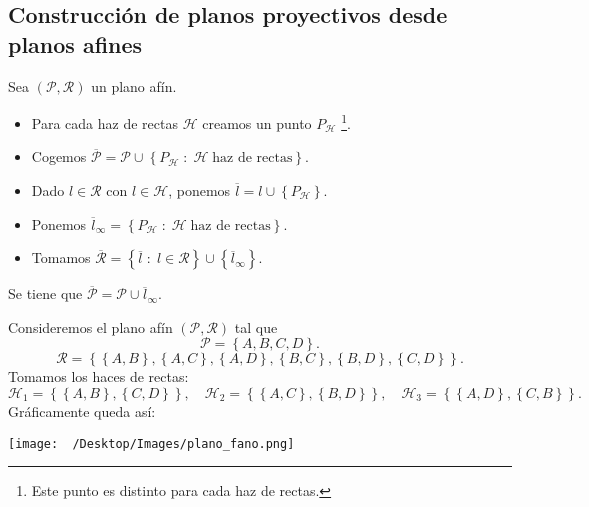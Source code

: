 \subsection{Construcción de planos proyectivos desde planos afines}
Sea $\displaystyle \left(\mathcal{P}, \mathcal{R}\right) $ un plano afín. 
\begin{itemize}
\item Para cada haz de rectas $\displaystyle \mathcal{H} $ creamos un punto $\displaystyle P_{\mathcal{H}} $ \footnote{Este punto es distinto para cada haz de rectas.}.
\item Cogemos $\displaystyle \overline{\mathcal{P}} = \mathcal{P} \cup \left\{ P_{\mathcal{H}} \; : \; \mathcal{H} \; \text{haz de rectas}\right\}  $.
\item Dado $\displaystyle l \in \mathcal{R} $ con $\displaystyle l \in \mathcal{H} $, ponemos $\displaystyle \overline{l} = l \cup \left\{ P_{\mathcal{H}}\right\}  $.
\item Ponemos $\displaystyle \overline{l}_{\infty} = \left\{ P_{\mathcal{H}} \; : \; \mathcal{H} \; \text{haz de rectas}\right\}  $.
\item Tomamos $\displaystyle \overline{\mathcal{R}} = \left\{ \overline{l} \; : \; l \in \mathcal{R}\right\} \cup \left\{ \overline{l}_{\infty}\right\} $.
\end{itemize}
\begin{observation}
Se tiene que $\displaystyle \overline{\mathcal{P}} = \mathcal{P}\cup \overline{l}_{\infty} $.
\end{observation}
\begin{eg}
Consideremos el plano afín $\displaystyle \left(\mathcal{P}, \mathcal{R}\right) $ tal que 
\[\mathcal{P} = \left\{ A, B, C, D\right\}  .\]
\[\mathcal{R} = \left\{ \left\{ A,B\right\} , \left\{ A,C\right\} , \left\{ A,D\right\} , \left\{ B,C\right\} , \left\{ B, D\right\} , \left\{ C, D\right\} \right\}  .\]
Tomamos los haces de rectas:
\[ \mathcal{H}_{1} = \left\{ \left\{ A,B\right\} , \left\{ C,D\right\} \right\}, \quad \mathcal{H}_{2} = \left\{ \left\{ A,C\right\} , \left\{ B,D\right\} \right\} , \quad \mathcal{H}_{3} = \left\{ \left\{ A,D\right\}, \left\{ C,B\right\} \right\} .\]
Gráficamente queda así:
\begin{center}
\texttt{[image: ~/Desktop/Images/plano\_fano.png]}
\end{center}
\end{eg}

